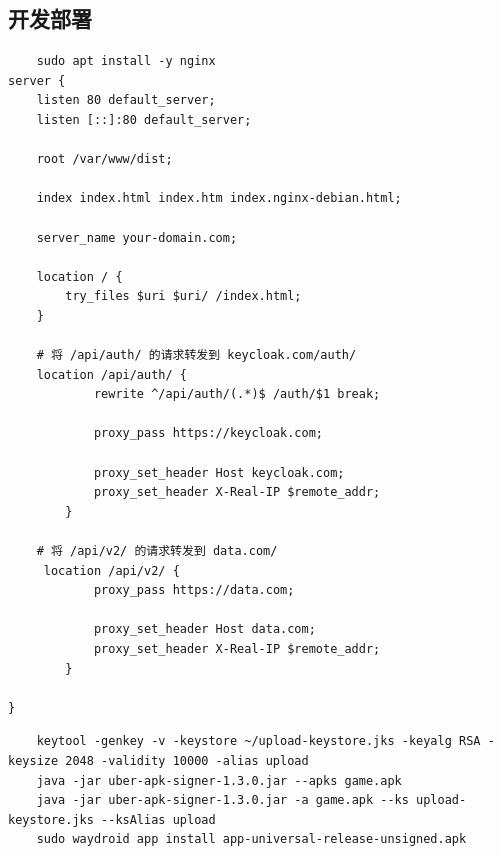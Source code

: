 \subsection{开发部署}
\begin{code}[title=/etc/nginx/sites-enabled/default]
	\begin{verbatim}
	sudo apt install -y nginx
server {
    listen 80 default_server;
    listen [::]:80 default_server;

    root /var/www/dist;

    index index.html index.htm index.nginx-debian.html;

    server_name your-domain.com;

    location / {
        try_files $uri $uri/ /index.html;
    }

    # 将 /api/auth/ 的请求转发到 keycloak.com/auth/
    location /api/auth/ {
            rewrite ^/api/auth/(.*)$ /auth/$1 break;

            proxy_pass https://keycloak.com;

            proxy_set_header Host keycloak.com;
            proxy_set_header X-Real-IP $remote_addr;
        }

    # 将 /api/v2/ 的请求转发到 data.com/
     location /api/v2/ {
            proxy_pass https://data.com;

            proxy_set_header Host data.com;
            proxy_set_header X-Real-IP $remote_addr;
        }

}
\end{verbatim}
\end{code}

\begin{code}[title=Build APK]
	\begin{verbatim}
	keytool -genkey -v -keystore ~/upload-keystore.jks -keyalg RSA -keysize 2048 -validity 10000 -alias upload
    java -jar uber-apk-signer-1.3.0.jar --apks game.apk
    java -jar uber-apk-signer-1.3.0.jar -a game.apk --ks upload-keystore.jks --ksAlias upload
    sudo waydroid app install app-universal-release-unsigned.apk
\end{verbatim}
\end{code}
